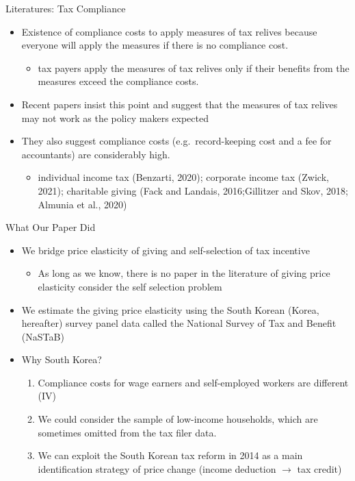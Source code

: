 \documentclass[
  ignorenonframetext,
  aspectratio=169,
]{beamer}
\providecommand{\tightlist}{%
  \setlength{\itemsep}{0pt}\setlength{\parskip}{0pt}}
\begin{document}
\begin{frame}{Literatures: Tax Compliance}
\protect\hypertarget{literatures-tax-compliance}{}
\begin{itemize}
\tightlist
\item
  Existence of compliance costs to apply measures of tax relives because everyone will apply the measures if there is no compliance cost.

  \begin{itemize}
  \tightlist
  \item
    tax payers apply the measures of tax relives only if their benefits from the measures exceed the compliance costs.
  \end{itemize}
\item
  Recent papers insist this point and suggest that the measures of tax relives may not work as the policy makers expected
\item
  They also suggest compliance costs (e.g.~record-keeping cost and a fee for accountants) are considerably high.

  \begin{itemize}
  \tightlist
  \item
    individual income tax (Benzarti, 2020); corporate income tax (Zwick, 2021); charitable giving (Fack and Landais, 2016;Gillitzer and Skov, 2018; Almunia et al., 2020)
  \end{itemize}
\end{itemize}
\end{frame}

\begin{frame}{What Our Paper Did}
\protect\hypertarget{what-our-paper-did}{}
\begin{itemize}
\tightlist
\item
  We bridge price elasticity of giving and self-selection of tax incentive

  \begin{itemize}
  \tightlist
  \item
    As long as we know, there is no paper in the literature of giving price elasticity consider the self selection problem
  \end{itemize}
\item
  We estimate the giving price elasticity using the South Korean (Korea, hereafter) survey panel data called the National Survey of Tax and Benefit (NaSTaB)
\item
  Why South Korea?

  \begin{enumerate}
  \tightlist
  \item
    Compliance costs for wage earners and self-employed workers are different (IV)
  \item
    We could consider the sample of low-income households, which are sometimes omitted from the tax filer data.
  \item
    We can exploit the South Korean tax reform in 2014 as a main identification strategy of price change (income deduction \(\to\) tax credit)
  \end{enumerate}
\end{itemize}
\end{frame}
\end{document}
